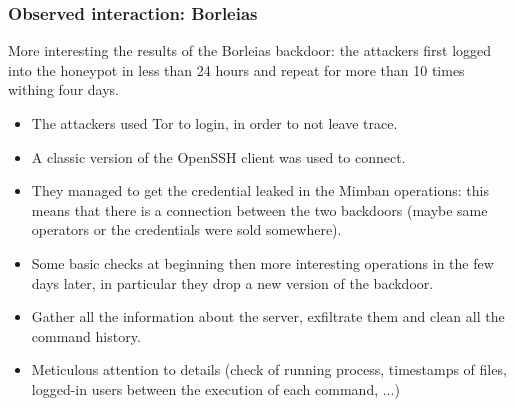 \begin{frame}
	\frametitle{Observed interaction: Borleias}
	
	More interesting the results of the Borleias backdoor: the attackers first logged into the honeypot in less than 24 hours and repeat for more than 10 times withing four days.
	
	\smallskip
	
	\begin{itemize}
	  \item The attackers used Tor to login, in order to not leave trace.
	  \item A classic version of the OpenSSH client was used to connect.
	  \item They managed to get the credential leaked in the Mimban operations: this means that there is a connection between the two backdoors (maybe same operators or the credentials were sold somewhere).
	  \item Some basic checks at beginning then more interesting operations in the few days later, in particular they drop a new version of the backdoor.
	  \item Gather all the information about the server, exfiltrate them and clean all the command history.
	  \item Meticulous attention to details (check of running process, timestamps of files, logged-in users between the execution of each command, ...)
	\end{itemize} 
	
\end{frame}
